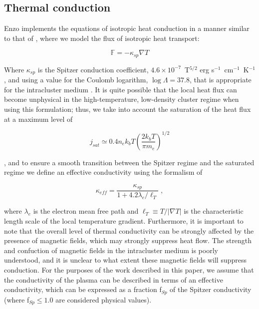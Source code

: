 \subsection{Thermal conduction}
\label{sec.num.conductions}

Enzo implements the equations of isotropic heat conduction in a manner
similar to that of \citet{2007ApJ...664..135P}, where we model the
flux of isotropic heat transport:

\begin{equation}
\mathbb{F} = -\kappa_{sp} \nabla T
\end{equation}

Where $\kappa_{sp}$ is the Spitzer conduction coefficient, $4.6 \times 10^{-7}$~T$^{5/2}$ erg
s$^{-1}$~cm$^{-1}$~K$^{-1}$ \citep{1962pfig.book.....S}, and using a
value for the Coulomb logarithm, $\log \Lambda = 37.8$, that is
appropriate for the intracluster medium \citep{1988xrec.book.....S}.
It is quite possible that the local heat flux can become unphysical in
the high-temperature, low-density cluster regime when using this
formulation; thus, we take into account the saturation of the heat
flux at a maximum level of

\begin{equation}
j_{sat} \simeq 0.4 n_e k_b T \left( \frac{2 k_b T}{\pi m_e} \right)^{1/2}
\end{equation}

\citep{1977ApJ...211..135C}, and to ensure a smooth transition between
the Spitzer regime and the saturated regime we define an effective
conductivity using the formalism of \citet{1988xrec.book.....S}

\begin{equation}
\kappa_{eff} = \frac{\kappa_{sp}}{1 + 4.2 \lambda_e / \ell_T} \; ,
\end{equation}

where $\lambda_e$ is the electron mean free path and $\ell_T \equiv T
/ |\nabla T|$ is the characteristic length scale of the local
temperature gradient.  Furthermore, it is important to note that the
overall level of thermal conductivity can be strongly affected
by the presence of magnetic fields, which may strongly suppress heat
flow.  The strength and confuction of magnetic fields in the
intracluster medium is poorly understood, and it is unclear to what
extent these magnetic fields will suppress conduction.  For the
purposes of the work described in this paper, we assume that the
conductivity of the plasma can be described in terms of an effective
conductivity, which can be expressed as a fraction f$_{Sp}$ of the
Spitzer conductivity (where f$_{Sp} \leq 1.0$ are considered physical
values).


